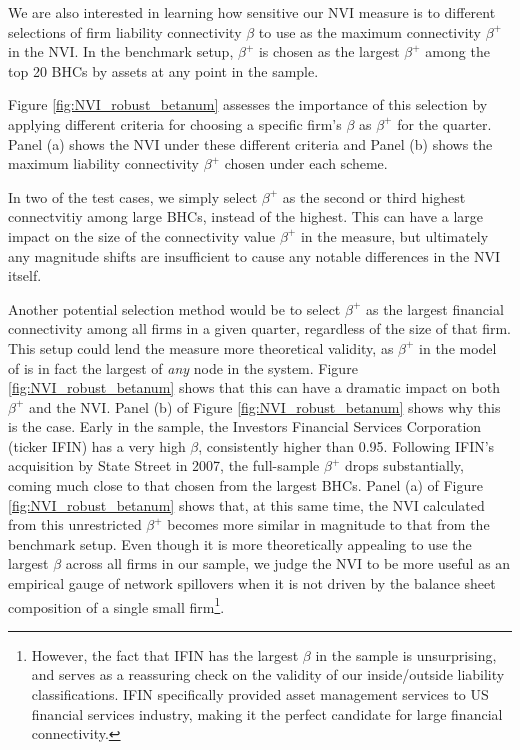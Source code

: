 We are also interested in learning how sensitive our NVI measure is to different selections of firm liability connectivity $\beta$ to use as the maximum connectivity $\beta^+$ in the NVI. In the benchmark setup, $\beta^+$ is chosen as the largest $\beta^+$ among the top 20 BHCs by assets at any point in the sample.

Figure \ref{fig:NVI_robust_betanum} assesses the importance of this selection by applying different criteria for choosing a specific firm's $\beta$ as $\beta^+$ for the quarter. Panel (a) shows the NVI under these different criteria and Panel (b) shows the maximum liability connectivity $\beta^+$ chosen under each scheme.

In two of the test cases, we simply select $\beta^+$ as the second or third highest connectvitiy among large BHCs, instead of the highest. This can have a large impact on the size of the connectivity value $\beta^+$ in the measure, but ultimately any magnitude shifts are insufficient to cause any notable differences in the NVI itself. 

Another potential selection method would be to select $\beta^+$ as the largest financial connectivity among all firms in a given quarter, regardless of the size of that firm. This setup could lend the measure more theoretical validity, as $\beta^+$ in the model of \citet{glasserman2015likely} is in fact the largest of \textit{any} node in the system. Figure \ref{fig:NVI_robust_betanum} shows that this can have a dramatic impact on both $\beta^+$ and the NVI. Panel (b) of Figure \ref{fig:NVI_robust_betanum} shows why this is the case. Early in the sample, the Investors Financial Services Corporation (ticker IFIN) has a very high $\beta$, consistently higher than 0.95. Following IFIN's acquisition by State Street in 2007, the full-sample $\beta^+$ drops substantially, coming much close to that chosen from the largest BHCs. Panel (a) of Figure \ref{fig:NVI_robust_betanum} shows that, at this same time, the NVI calculated from this unrestricted $\beta^+$ becomes more similar in magnitude to that from the benchmark setup. Even though it is more theoretically appealing to use the largest $\beta$ across all firms in our sample, we judge the NVI to be more useful as an empirical gauge of network spillovers when it is not driven by the balance sheet composition of a single small firm\footnote{However, the fact that IFIN has the largest $\beta$ in the sample is unsurprising, and serves as a reassuring check on the validity of our inside/outside liability classifications. IFIN specifically provided asset management services to US financial services industry, making it the perfect candidate for large financial connectivity.}.

